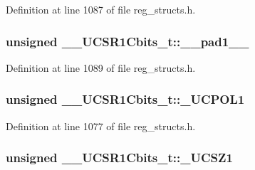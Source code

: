 Definition at line 1087 of file reg\+\_\+structs.\+h.

\hypertarget{union_____u_c_s_r1_cbits__t_a52c5209bf64b32709b206152354480af}{
\subsubsection[{\+\_\+\+\_\+pad1\+\_\+\+\_\+}]{\setlength{\rightskip}{0pt plus 5cm}unsigned \+\_\+\+\_\+\+U\+C\+S\+R1\+Cbits\+\_\+t\+::\+\_\+\+\_\+pad1\+\_\+\+\_\+}}\label{union_____u_c_s_r1_cbits__t_a52c5209bf64b32709b206152354480af}


Definition at line 1089 of file reg\+\_\+structs.\+h.

\hypertarget{union_____u_c_s_r1_cbits__t_ac7265c8336dde1215cb9537bf4bd2549}{
\subsubsection[{\+\_\+\+U\+C\+P\+O\+L1}]{\setlength{\rightskip}{0pt plus 5cm}unsigned \+\_\+\+\_\+\+U\+C\+S\+R1\+Cbits\+\_\+t\+::\+\_\+\+U\+C\+P\+O\+L1}}\label{union_____u_c_s_r1_cbits__t_ac7265c8336dde1215cb9537bf4bd2549}


Definition at line 1077 of file reg\+\_\+structs.\+h.

\hypertarget{union_____u_c_s_r1_cbits__t_a1b9edbb5dd9377d594d7d8c86bd64590}{
\subsubsection[{\+\_\+\+U\+C\+S\+Z1}]{\setlength{\rightskip}{0pt plus 5cm}unsigned \+\_\+\+\_\+\+U\+C\+S\+R1\+Cbits\+\_\+t\+::\+\_\+\+U\+C\+S\+Z1}}\label{union_____u_c_s_r1_cbits__t_a1b9edbb5dd9377d594d7d8c86bd64590}



